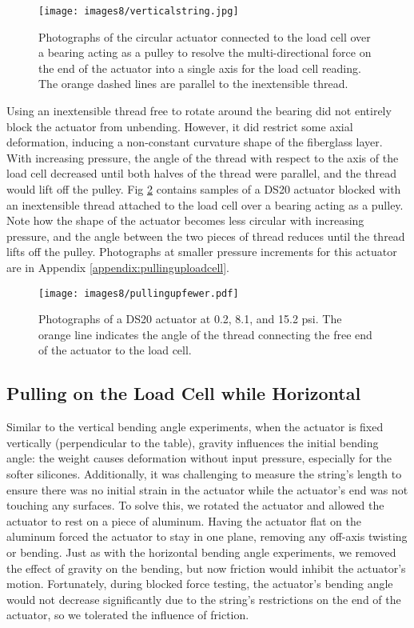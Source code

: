\begin{figure}[ht]
    \centering
     \texttt{[image: images8/verticalstring.jpg]}
    \caption{Photographs of the circular actuator connected to the load cell over a bearing acting as a pulley to resolve the multi-directional force on the end of the actuator into a single axis for the load cell reading. The orange dashed lines are parallel to the inextensible thread.}
    \label{fig:verticalstring}
\end{figure}

Using an inextensible thread free to rotate around the bearing did not entirely block the actuator from unbending. However, it did restrict some axial deformation, inducing a non-constant curvature shape of the fiberglass layer. With increasing pressure, the angle of the thread with respect to the axis of the load cell decreased until both halves of the thread were parallel, and the thread would lift off the pulley. Fig \ref{fig:verticalstringanglefewer} contains samples of a DS20 actuator blocked with an inextensible thread attached to the load cell over a bearing acting as a pulley. Note how the shape of the actuator becomes less circular with increasing pressure, and the angle between the two pieces of thread reduces until the thread lifts off the pulley. Photographs at smaller pressure increments for this actuator are in Appendix \ref{appendix:pullinguploadcell}. 

\begin{figure}[ht]
    \centering
     \texttt{[image: images8/pullingupfewer.pdf]}
    \caption{Photographs of a DS20 actuator at 0.2, 8.1, and 15.2 psi. The orange line indicates the angle of the thread connecting the free end of the actuator to the load cell.}
    \label{fig:verticalstringanglefewer}
\end{figure}

\clearpage
\subsection{Pulling on the Load Cell while Horizontal}

Similar to the vertical bending angle experiments, when the actuator is fixed vertically (perpendicular to the table), gravity influences the initial bending angle: the weight causes deformation without input pressure, especially for the softer silicones. Additionally, it was challenging to measure the string's length to ensure there was no initial strain in the actuator while the actuator's end was not touching any surfaces. To solve this, we rotated the actuator and allowed the actuator to rest on a piece of aluminum. Having the actuator flat on the aluminum forced the actuator to stay in one plane, removing any off-axis twisting or bending. Just as with the horizontal bending angle experiments, we removed the effect of gravity on the bending, but now friction would inhibit the actuator's motion. Fortunately, during blocked force testing, the actuator's bending angle would not decrease significantly due to the string's restrictions on the end of the actuator, so we tolerated the influence of friction. 

